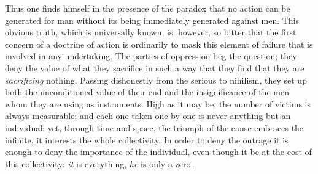 \documentclass[11pt]{article}
\begin{document}
{{Thus one finds himself in the presence of the paradox that no action can be generated for man without its being immediately generated against men. This obvious truth, which is universally known, is, however, so bitter that the first concern of a doctrine of action is ordinarily to mask this element of failure that is involved in any undertaking. The parties of oppression beg the question; they deny the value of what they sacrifice in such a way that they find that they are \textit{sacrificing} nothing. Passing dishonestly from the serious to nihilism, they set up both the unconditioned value of their end and the insignificance of the men whom they are using as instruments. High as it may be, the number of victims is always measurable; and each one taken one by one is never anything but an individual: yet, through time and space, the triumph of the cause embraces the infinite, it interests the whole collectivity. In order to deny the outrage it is enough to deny the importance of the individual, even though it be at the cost of this collectivity: \textit{it} is everything, \textit{he} is only a zero.

}}
\end{document}
